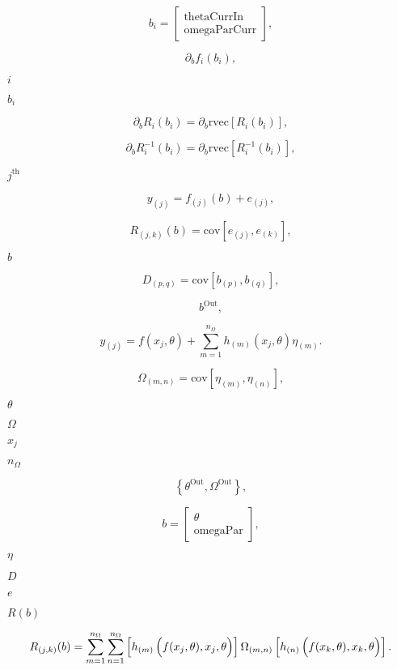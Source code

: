 \documentclass{article}
\begin{document}
\[ b_i = \left[ \begin{array}{c} \mbox{thetaCurrIn} \\ \mbox{omegaParCurr} \end{array} \right] , \]
\pagebreak

\[ \partial_b f_i(b_i) , \]
\pagebreak

$ i $
\pagebreak

$ b_i $
\pagebreak

\[ \partial_b R_i(b_i) = \partial_b \mbox{rvec} \left[ R_i(b_i) \right] , \]
\pagebreak

\[ \partial_b R^{-1}_i(b_i) = \partial_b \mbox{rvec} \left[ R^{-1}_i(b_i) \right] , \]
\pagebreak

$j^{\mbox{th}}$
\pagebreak

\[ y_{(j)} = f_{(j)}(b) + e_{(j)} , \]
\pagebreak

\[ R_{(j,k)}(b) = \mbox{cov}[e_{(j)},e_{(k)}] , \]
\pagebreak

$b$
\pagebreak

\[ D_{(p,q)} = \mbox{cov}[b_{(p)},b_{(q)}] , \]
\pagebreak

\[ b^{\mbox{Out}} , \]
\pagebreak

\[ y_{(j)} = f(x_{j}, \theta) + \sum_{m=1}^{n_{\Omega}} h_{(m)}(x_{j}, \theta) \eta_{(m)} . \]
\pagebreak

\[ \Omega_{(m,n)} = \mbox{cov}[\eta_{(m)},\eta_{(n)}] , \]
\pagebreak

$\theta$
\pagebreak

$\Omega$
\pagebreak

$x_{j}$
\pagebreak

$n_{\Omega}$
\pagebreak

\[ \left\{ \theta^{\mbox{Out}}, \Omega^{\mbox{Out}} \right\} , \]
\pagebreak

\[ b = \left[ \begin{array}{c} \theta \\ \mbox{omegaPar} \end{array} \right] , \]
\pagebreak

$\eta$
\pagebreak

$D$
\pagebreak

$e$
\pagebreak

$R(b)$
\pagebreak

\[ R_{(j,k)}(b) = \sum_{m=1}^{n_{\Omega}} \sum_{n=1}^{n_{\Omega}} \left[ h_{(m)}\left( \rule{0.0in}{0.15in} f(x_j, \theta), x_j, \theta \right) \right] \Omega_{(m,n)} \left[ h_{(n)}\left( \rule{0.0in}{0.15in} f(x_{k}, \theta), x_{k}, \theta \right) \right] . \]
\pagebreak
\end{document}
